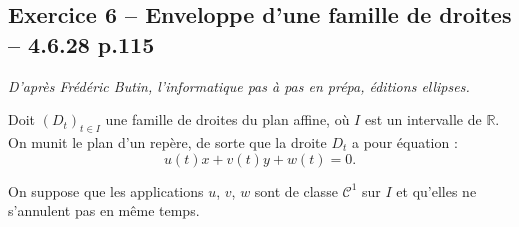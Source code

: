 \documentclass[10pt,fleqn]{article} %
\begin{document}
\begin{multicols}{2}
\subsection*{Exercice 6 -- Enveloppe d'une famille de droites -- 4.6.28 p.115}
\begin{flushright}
\textit{D'après Frédéric Butin, l'informatique pas à pas en prépa, éditions ellipses.}
\end{flushright}

Doit $\left(D_t\right)_{t\in I}$ une famille de droites du plan affine, où $I$ est un intervalle de $\mathbb{R}$. On munit le plan d'un repère, de sorte que la droite $D_t$ a pour équation :
$$
u(t) x+v(t) y + w(t) = 0.
$$

On suppose que les applications $u$, $v$, $w$ sont de classe $\mathcal{C}^1$ sur $I$ et qu'elles ne s'annulent pas en même temps. 


\end{multicols}
\end{document}
